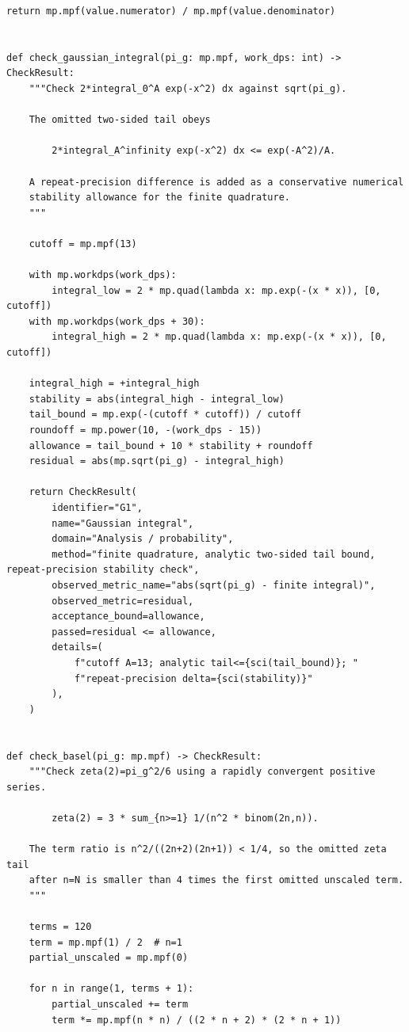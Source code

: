 \documentclass[11pt]{article}
\begin{document}
\begin{lstlisting}[style=pythonstyle,caption={Verification driver: \texttt{verify\_pi\_g\_identities.py}}]
    return mp.mpf(value.numerator) / mp.mpf(value.denominator)


def check_gaussian_integral(pi_g: mp.mpf, work_dps: int) -> CheckResult:
    """Check 2*integral_0^A exp(-x^2) dx against sqrt(pi_g).

    The omitted two-sided tail obeys

        2*integral_A^infinity exp(-x^2) dx <= exp(-A^2)/A.

    A repeat-precision difference is added as a conservative numerical
    stability allowance for the finite quadrature.
    """

    cutoff = mp.mpf(13)

    with mp.workdps(work_dps):
        integral_low = 2 * mp.quad(lambda x: mp.exp(-(x * x)), [0, cutoff])
    with mp.workdps(work_dps + 30):
        integral_high = 2 * mp.quad(lambda x: mp.exp(-(x * x)), [0, cutoff])

    integral_high = +integral_high
    stability = abs(integral_high - integral_low)
    tail_bound = mp.exp(-(cutoff * cutoff)) / cutoff
    roundoff = mp.power(10, -(work_dps - 15))
    allowance = tail_bound + 10 * stability + roundoff
    residual = abs(mp.sqrt(pi_g) - integral_high)

    return CheckResult(
        identifier="G1",
        name="Gaussian integral",
        domain="Analysis / probability",
        method="finite quadrature, analytic two-sided tail bound, repeat-precision stability check",
        observed_metric_name="abs(sqrt(pi_g) - finite integral)",
        observed_metric=residual,
        acceptance_bound=allowance,
        passed=residual <= allowance,
        details=(
            f"cutoff A=13; analytic tail<={sci(tail_bound)}; "
            f"repeat-precision delta={sci(stability)}"
        ),
    )


def check_basel(pi_g: mp.mpf) -> CheckResult:
    """Check zeta(2)=pi_g^2/6 using a rapidly convergent positive series.

        zeta(2) = 3 * sum_{n>=1} 1/(n^2 * binom(2n,n)).

    The term ratio is n^2/((2n+2)(2n+1)) < 1/4, so the omitted zeta tail
    after n=N is smaller than 4 times the first omitted unscaled term.
    """

    terms = 120
    term = mp.mpf(1) / 2  # n=1
    partial_unscaled = mp.mpf(0)

    for n in range(1, terms + 1):
        partial_unscaled += term
        term *= mp.mpf(n * n) / ((2 * n + 2) * (2 * n + 1))


\end{lstlisting}
\end{document}
